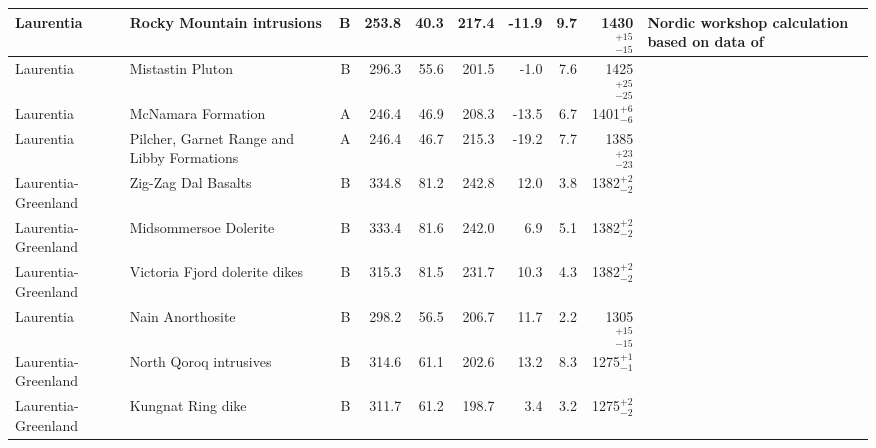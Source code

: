 \begin{longtable}{p{1 in}p{1 in}rrrrrrrp{1.5 in}}
                     Laurentia &                        Rocky Mountain intrusions &      B &     253.8 &      40.3 & 217.4 & -11.9 &       9.7 &   1430$^{+15}_{-15}$ &  Nordic workshop calculation based on data of \cite{Harlan1994a,Harlan1998a} \\ \hline
                     Laurentia &                                 Mistastin Pluton &      B &     296.3 &      55.6 & 201.5 &  -1.0 &       7.6 &   1425$^{+25}_{-25}$ &                                 \cite{Fahrig1976a} \\ \hline
                     Laurentia &                               McNamara Formation &      A &     246.4 &      46.9 & 208.3 & -13.5 &       6.7 &     1401$^{+6}_{-6}$ &                                 \cite{Elston2002a} \\ \hline
                     Laurentia &       Pilcher, Garnet Range and Libby Formations &      A &     246.4 &      46.7 & 215.3 & -19.2 &       7.7 &   1385$^{+23}_{-23}$ &                                 \cite{Elston2002a} \\ \hline
           Laurentia-Greenland &                              Zig-Zag Dal Basalts &      B &     334.8 &      81.2 & 242.8 &  12.0 &       3.8 &     1382$^{+2}_{-2}$ &                              \cite{Marcussen1983a} \\ \hline
           Laurentia-Greenland &                            Midsommersoe Dolerite &      B &     333.4 &      81.6 & 242.0 &   6.9 &       5.1 &     1382$^{+2}_{-2}$ &                              \cite{Marcussen1983a} \\ \hline
           Laurentia-Greenland &                    Victoria Fjord dolerite dikes &      B &     315.3 &      81.5 & 231.7 &  10.3 &       4.3 &     1382$^{+2}_{-2}$ &                             \cite{Abrahamsen1987a} \\ \hline
                     Laurentia &                                 Nain Anorthosite &      B &     298.2 &      56.5 & 206.7 &  11.7 &       2.2 &   1305$^{+15}_{-15}$ &                                \cite{Murthy1978a} \\ \hline
           Laurentia-Greenland &                           North Qoroq intrusives &      B &     314.6 &      61.1 & 202.6 &  13.2 &       8.3 &     1275$^{+1}_{-1}$ &                                  \cite{Piper1992a} \\ \hline
           Laurentia-Greenland &                                Kungnat Ring dike &      B &     311.7 &      61.2 & 198.7 &   3.4 &       3.2 &     1275$^{+2}_{-2}$ &                                  \cite{Piper1977b} \\ \hline

\end{longtable}
